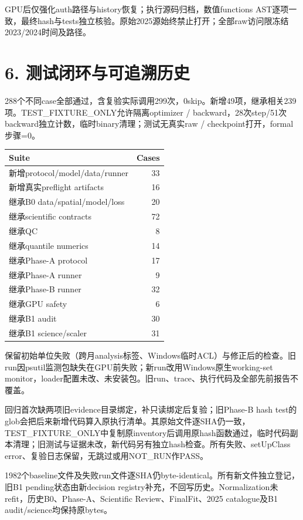 \documentclass[10pt,a4paper,fontset=windows]{ctexart}
\renewcommand{\arraystretch}{1.15}
\begin{document}
GPU后仅强化auth路径与history恢复；执行源码归档，数值functions AST逐项一致，最终hash与tests独立核验。原始2025源始终禁止打开；全部raw访问限冻结2023/2024时间及路径。
\newpage
\begingroup\small\setlength{\parskip}{4pt}\renewcommand{\arraystretch}{1}
\section*{6. 测试闭环与可追溯历史}
288个不同case全部通过，含复验实际调用299次，0skip。新增49项，继承相关239项。TEST\_FIXTURE\_ONLY允许隔离optimizer / backward，28次step/51次backward独立计数，临时binary清理；测试无真实raw / checkpoint打开，formal步骤=0。
\begin{center}{\small\begin{tabular}{lr}\toprule
Suite & Cases\\\midrule
新增protocol/model/data/runner & 33 \\
新增真实preflight artifacts & 16 \\
继承B0 data/spatial/model/loss & 20 \\
继承scientific contracts & 72 \\
继承QC & 8 \\
继承quantile numerics & 14 \\
继承Phase-A protocol & 17 \\
继承Phase-A runner & 9 \\
继承Phase-B runner & 32 \\
继承GPU safety & 6 \\
继承B1 audit & 30 \\
继承B1 science/scaler & 31 \\
\bottomrule\end{tabular}}\end{center}
保留初始单位失败（跨月analysis标签、Windows临时ACL）与修正后的检查。旧run因psutil监测包缺失在GPU前失败；新run改用Windows原生working-set monitor，loader配置未改、未安装包。旧run、trace、执行代码及全部先前报告不覆盖。

回归首次缺两项旧evidence目录绑定，补只读绑定后复验；旧Phase-B hash test的glob会把后来新增代码算入原执行清单。其原始文件逐SHA仍一致，TEST\_FIXTURE\_ONLY中复制原inventory后调用原hash函数通过，临时代码副本清理；旧测试与证据未改，新代码另有独立hash检查。所有失败、setUpClass error、复验日志保留，无跳过或用NOT\_RUN作PASS。

1982个baseline文件及失败run文件逐SHA仍byte-identical。所有新文件独立登记，旧B1 pending状态由新decision registry补充，不回写历史。Normalization未refit，历史B0、Phase-A、Scientific Review、FinalFit、2025 catalogue及B1 audit/science均保持原bytes。
\end{document}
